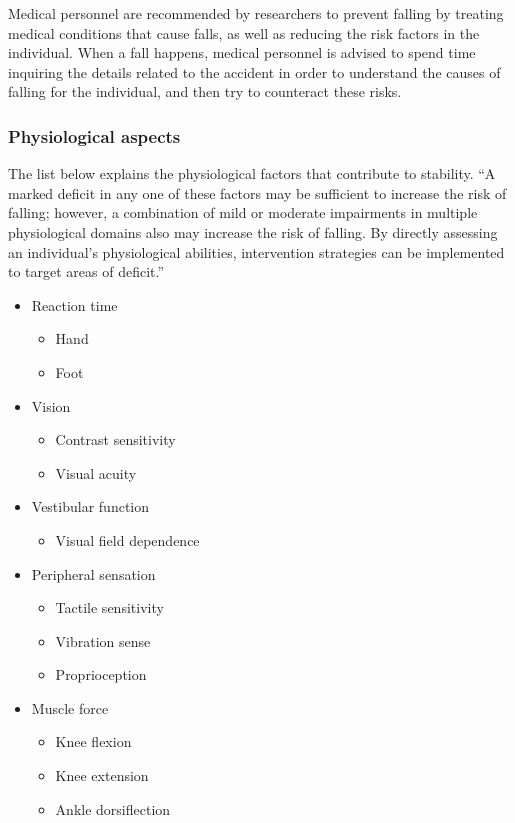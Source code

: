 Medical personnel are recommended by researchers to prevent falling by treating medical conditions that cause falls, as well as reducing the risk factors in the individual. When a fall happens, medical personnel is advised to spend time inquiring the details related to the accident in order to understand the causes of falling for the individual, and then try to counteract these risks.

\subsubsection{Physiological aspects}

The list below explains the physiological factors that contribute to stability. “A marked deficit in any one of these factors may be sufficient to increase the risk of falling; however, a combination of mild or moderate impairments in multiple physiological domains also may increase the risk of falling. By directly assessing an individual's physiological abilities, intervention strategies can be implemented to target areas of deficit.” \cite{LMTassessPrev}

\begin{itemize}
\item Reaction time
\begin{itemize}
\item Hand
\item Foot
\end{itemize}
\item Vision
\begin{itemize}
\item Contrast sensitivity
\item Visual acuity
\end{itemize}
\item Vestibular function
\begin{itemize}
\item Visual field dependence
\end{itemize}
\item 
Peripheral sensation
\begin{itemize}
\item Tactile sensitivity
\item Vibration sense
\item Proprioception
\end{itemize}
\item Muscle force
\begin{itemize}
\item Knee flexion
\item Knee extension
\item Ankle dorsiflection
\end{itemize}
\end{itemize}



